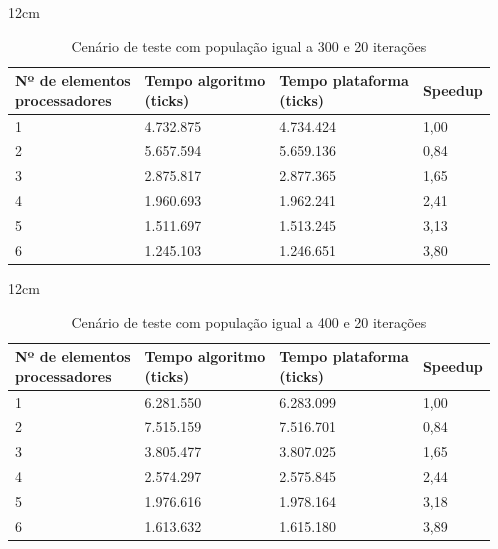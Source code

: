 \begin{table}[h]{12cm}
    \caption{Cenário de teste com população igual a 300 e 20 iterações}
    \label{tbl:taylor-vortex-parameters}
    \begin{tabular}{llll}
        \hline
        \shortstack[l]{Nº de elementos \\ processadores} & \shortstack[l]{Tempo algoritmo \\ (ticks)} & \shortstack[l]{Tempo plataforma \\ (ticks)} & Speedup \\
        \hline
        1 & 4.732.875 & 4.734.424 & 1,00 \\
        2 & 5.657.594 & 5.659.136 & 0,84 \\
        3 & 2.875.817 & 2.877.365 &	1,65 \\
        4 & 1.960.693 & 1.962.241 & 2,41 \\
        5 & 1.511.697 & 1.513.245 & 3,13 \\
        6 & 1.245.103 & 1.246.651 & 3,80 \\
        \hline
    \end{tabular}
\end{table}

\begin{table}[h]{12cm}
    \caption{Cenário de teste com população igual a 400 e 20 iterações}
    \label{tbl:taylor-vortex-parameters}
    \begin{tabular}{llll}
        \hline
        \shortstack[l]{Nº de elementos \\ processadores} & \shortstack[l]{Tempo algoritmo \\ (ticks)} & \shortstack[l]{Tempo plataforma \\ (ticks)} & Speedup \\
        \hline
        1 & 6.281.550 & 6.283.099 & 1,00 \\
        2 & 7.515.159 & 7.516.701 & 0,84 \\
        3 & 3.805.477 & 3.807.025 &	1,65 \\
        4 & 2.574.297 & 2.575.845 & 2,44 \\
        5 & 1.976.616 & 1.978.164 & 3,18 \\
        6 & 1.613.632 & 1.615.180 & 3,89 \\
        \hline
    \end{tabular}
\end{table}

